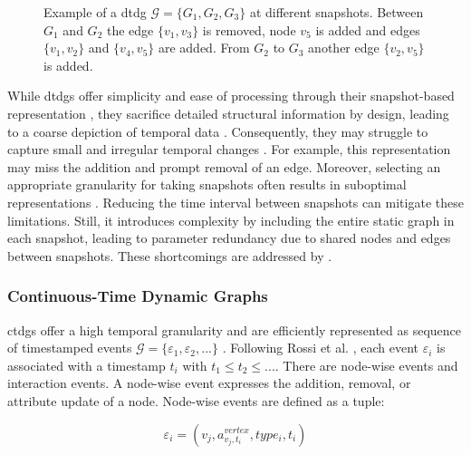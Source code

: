 \begin{figure}[h]
    
    \caption{Example of a \gls{dtdg} $\mathcal{G}=\{G_1, G_2, G_3\}$ at different snapshots. Between $G_1$ and $G_2$ the edge $\{v_1, v_3\}$ is removed, node $v_5$ is added and edges $\{v_1, v_2\}$ and $\{v_4, v_5\}$ are added. From $G_2$ to $G_3$ another edge $\{v_2, v_5\}$ is added.}
    \label{f_dtdg}
\end{figure}

While \glspl{dtdg} offer simplicity and ease of processing through their snapshot-based representation \cite{kazemi_representation_2019}, they sacrifice detailed structural information by design, leading to a coarse depiction of temporal data \cite{trivedi_dyrep_2019, kazemi_representation_2019}. Consequently, they may struggle to capture small and irregular temporal changes \cite{trivedi_dyrep_2019, souza_provably_2022}. For example, this representation may miss the addition and prompt removal of an edge. Moreover, selecting an appropriate granularity for taking snapshots often results in suboptimal representations \cite{trivedi_dyrep_2019}. Reducing the time interval between snapshots can mitigate these limitations. Still, it introduces complexity by including the entire static graph in each snapshot, leading to parameter redundancy due to shared nodes and edges between snapshots. These shortcomings are addressed by .

\subsubsection{Continuous-Time Dynamic Graphs}
\label{s_Background_Graphs_CTDGs}

\glspl{ctdg} offer a high temporal granularity \cite{trivedi_dyrep_2019} and are efficiently represented as sequence of timestamped events $\mathcal{G} = \{\varepsilon_{1}, \varepsilon_{2}, ...\}$ \cite{rossi_temporal_2020}. Following Rossi et al. \cite{rossi_temporal_2020}, each event $\varepsilon_{i}$ is associated with a timestamp $t_i$ with $t_1 \leq t_2 \leq ...$. 
There are node-wise events and interaction events. A node-wise event expresses the addition, removal, or attribute update of a node. Node-wise events are defined as a tuple:

\begin{equation}
    \varepsilon_{i} = (v_j, a^{vertex}_{v_j, t_i}, type_{i}, t_i)
\end{equation}

